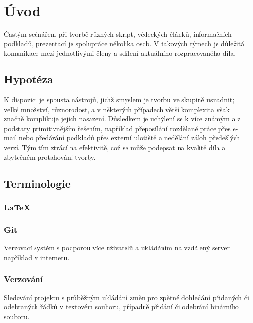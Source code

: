 \chapter{Úvod}
Častým scénářem při tvorbě různých skript, vědeckých článků, informačních podkladů, prezentací je spolupráce několika osob. V takových týmech je důležitá komunikace mezi jednotlivými členy a sdílení aktuálního rozpracovaného díla.

\section{Hypotéza}

K dispozici je spousta nástrojů, jichž smyslem je tvorbu ve skupině usnadnit; velké množství, různorodost, a v některých případech větší komplexita však značně komplikuje jejich nasazení. Důsledkem je uchýlení se k více známým a z podstaty primitivnějším řešením, například přeposílání rozdělané práce přes e-mail nebo předávání podkladů přes externí uložiště a nedělání záloh předešlých verzí. Tým tím ztrácí na efektivitě, což se může podepsat na kvalitě díla a zbytečném protahování tvorby.

\section{Terminologie}

\subsection{\LaTeX}

 \cite{latex-def}

\subsection{Git}

Verzovací systém s podporou více uživatelů a ukládáním na vzdálený server například v internetu.

\subsection{Verzování}

Sledování projektu s průběžným ukládání změn pro zpětné dohledání přidaných či odebraných řádků v textovém souboru, případně přidání či odebrání binárního souboru.

